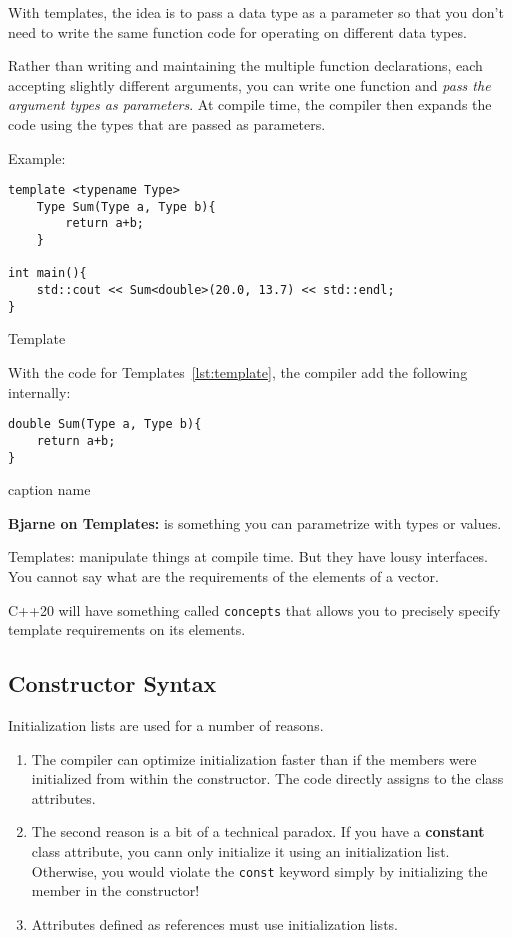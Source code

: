 \documentclass[11pt, a4paper]{article}
\begin{document}
With templates, the idea is to pass a data type as a parameter so that you don't need to write the same function code for operating on different data types. 

Rather than writing and maintaining the multiple function declarations, each accepting slightly different arguments, you can write one function and \textit{pass the argument types as parameters}. At compile time, the compiler then expands the code using the types that are passed as parameters. 

Example:

\begin{listing}[hbt!]
\begin{verbatim}
template <typename Type>
	Type Sum(Type a, Type b){
		return a+b;
	}

int main(){
	std::cout << Sum<double>(20.0, 13.7) << std::endl;
}
\end{verbatim}
\caption{Template}
\label{lst:template}
\end{listing}



With the code for Templates~\ref{lst:template}, the compiler add the following internally:

\begin{listing}[hbt!]
\begin{verbatim}
double Sum(Type a, Type b){
	return a+b;
}
\end{verbatim}
\caption{caption name}
\label{lst:caption_name}
\end{listing}




\textbf{Bjarne on Templates:} is something you can parametrize with types or values. 

Templates: manipulate things at compile time. But they have lousy interfaces. You cannot say what are the requirements of the elements of a vector.

C++20 will have something called \texttt{concepts} that allows you to precisely specify template requirements on its elements.




\subsection{Constructor Syntax}%
\label{sub:constructor_syntax}

Initialization lists are used for a number of reasons. 
\begin{enumerate}
	\item The compiler can optimize initialization faster than if the members were initialized from within the constructor. The code directly assigns to the class attributes. 
	\item The second reason is a bit of a technical paradox. If you have a \textbf{constant} class attribute, you cann only initialize it using an initialization list. Otherwise, you would violate the \texttt{const} keyword simply by initializing the member in the constructor!
	\item Attributes defined as references must use initialization lists.
\end{enumerate}
\end{document}

